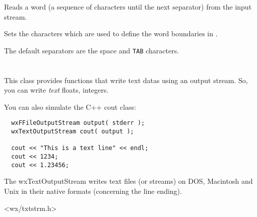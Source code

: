 \label{wxtextinputstreamreadword}


Reads a word (a sequence of characters until the next separator) from the
input stream.




\label{wxtextinputstreamsetstringseparators}


Sets the characters which are used to define the word boundaries in 
.

The default separators are the space and {\tt TAB} characters.


\section{}\label{wxtextoutputstream}

This class provides functions that write text datas using an output stream.
So, you can write {\it text} floats, integers.

You can also simulate the C++ cout class:

\begin{verbatim}
  wxFFileOutputStream output( stderr );
  wxTextOutputStream cout( output );

  cout << "This is a text line" << endl;
  cout << 1234;
  cout << 1.23456;
\end{verbatim}

The wxTextOutputStream writes text files (or streams) on DOS, Macintosh
and Unix in their native formats (concerning the line ending).


<wx/txtstrm.h>



\label{wxtextoutputstreamctor}



